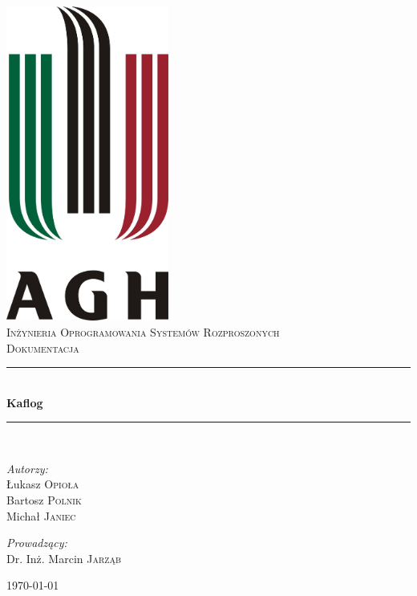 \documentclass[a4paper,11pt]{article}
\newcommand{\HRule}{\rule{\linewidth}{0.5mm}}
\begin{document}
\begin{titlepage}
    \begin{center}
        \includegraphics[width=0.4\textwidth]{images/logo.jpg} \\[1cm]
        \textsc{\LARGE Inżynieria Oprogramowania Systemów Rozproszonych} \\[0.8cm]
        \textsc{\LARGE Dokumentacja} \\[0.5cm]
        \HRule \\[0.4cm]
        { \huge \bfseries Kaflog} \\[0.4cm]
        \HRule \\[1.5cm]
    
    \begin{minipage}{0.4\textwidth}
        \begin{flushleft} \large
        \emph{Autorzy:} \\
        Łukasz \textsc{Opioła} \\
        Bartosz \textsc{Polnik} \\
        Michał \textsc{Janiec}
        \end{flushleft}
    \end{minipage}
    \begin{minipage}{0.4\textwidth}
        \begin{flushright} \large
            \emph{Prowadzący:} \\
            Dr. Inż. Marcin \textsc{Jarząb}
        \end{flushright}
    \end{minipage}

    \vfill

    {\large \today}

    \end{center}
\end{titlepage}
\end{document}
